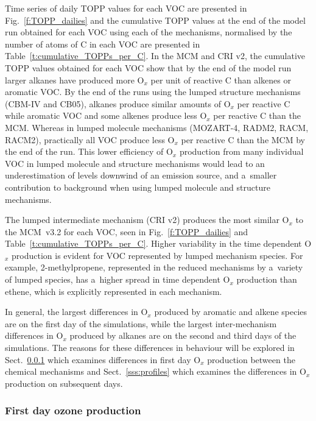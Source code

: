 \documentclass[acpd, online, hvmath]{copernicus}
\begin{document}
Time series of daily TOPP values for each VOC are presented in
Fig.~\ref{f:TOPP_dailies} and the cumulative TOPP values at the end of
the model run obtained for each VOC using each of the mechanisms,
normalised by the number of atoms of C in each VOC are presented in
Table~\ref{t:cumulative_TOPPs_per_C}.  In the MCM and CRI v2, the
cumulative TOPP values obtained for each VOC show that by the end of
the model run larger alkanes have produced more O$_{x}$ per unit of
reactive C than alkenes or aromatic VOC.  By the end of the runs using
the lumped structure mechanisms (CBM-IV and CB05), alkanes produce
similar amounts of O$_{x}$ per reactive C while aromatic VOC and
some alkenes produce less O$_{x}$ per reactive C than the MCM.
Whereas in lumped molecule mechanisms (MOZART-4, RADM2, RACM, RACM2),
practically all VOC produce less O$_{x}$ per reactive C than the
MCM by the end of the run.  This lower efficiency of O$_{x}$
production from many individual VOC in lumped molecule and structure
mechanisms would lead to an underestimation of  levels
downwind of an emission source, and a~smaller contribution to
background  when using lumped molecule and structure
mechanisms.

The lumped intermediate mechanism (CRI v2) produces the most similar
O$_{x}$ to the MCM~v3.2 for each VOC, seen in
Fig.~\ref{f:TOPP_dailies} and Table~\ref{t:cumulative_TOPPs_per_C}.
Higher variability in the time dependent O$_{x}$ production is
evident for VOC represented by lumped mechanism species.  For example,
2-methylpropene, represented in the reduced mechanisms by a~variety of
lumped species, has a~higher spread in time dependent O$_{x}$
production than ethene, which is explicitly represented in each
mechanism.

In general, the largest differences in O$_{x}$ produced by aromatic
and alkene species are on the first day of the simulations, while the
largest inter-mechanism differences in O$_{x}$ produced by alkanes
are on the second and third days of the simulations.  The reasons for
these differences in behaviour will be explored in
Sect.~\ref{sss:day1} which examines differences in first day
O$_{x}$ production between the chemical mechanisms and
Sect.~\ref{sss:profiles} which examines the differences in O$_{x}$
production on subsequent days.

\subsubsection{First day ozone production}
\label{sss:day1}
\end{document}

